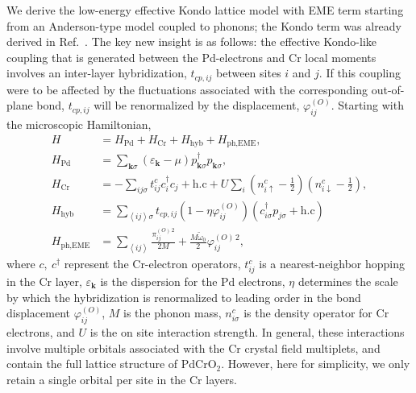 \documentclass[aps,prl,twocolumn,superscriptaddress,amsmath,nofootinbib,10pt,floatfix]{revtex4-2}
\begin{document}
\begin{widetext}
We derive the low-energy effective Kondo lattice model with EME term starting from an Anderson-type model coupled to phonons; the Kondo term was already derived in Ref.~\cite{sunko_probing_2020}.
The key new insight is as follows: the effective Kondo-like coupling
that is generated between the Pd-electrons and Cr local moments involves
an inter-layer hybridization, $t_{cp,ij}$ between sites $i$ and $j$.
If this coupling were to be affected by the fluctuations associated
with the corresponding out-of-plane bond, $t_{cp,ij}$ will be renormalized
by the displacement, $\varphi^{(O)}_{ij}$. Starting with the microscopic
Hamiltonian,
\begin{align}
H & =H_{\text{Pd}}+H_{\text{Cr}}+H_{\text{hyb}}+H_{\text{ph,EME}},\\
H_{\text{Pd}} & =\sum_{\boldsymbol{k}\sigma}\left(\varepsilon_{\boldsymbol{k}}-\mu\right)p_{\boldsymbol{k}\sigma}^{\dagger}p_{\boldsymbol{k}\sigma},\\
H_{\text{Cr}} & =-\sum_{ij\sigma}t_{ij}^{c}c_{i}^{\dagger}c_{j}+\text{h.c}+U\sum_{i}\left(n_{i\uparrow}^{c}-\frac{1}{2}\right)\left(n_{i\downarrow}^{c}-\frac{1}{2}\right),\\
H_{\text{hyb}} & =\sum_{\left\langle ij\right\rangle \sigma}t_{cp,ij}\left(1-\eta\varphi^{(O)}_{ij}\right)\left(c_{i\sigma}^{\dagger}p_{j\sigma}+\text{h.c}\right)\\
H_{\text{ph,EME}} & =\sum_{\left\langle ij\right\rangle }\frac{\pi_{ij}^{(O)\,2}}{2M}+\frac{M\tilde{\omega}_{0}}{2}\varphi_{ij}^{(O)\,2},
\end{align}
where $c,~c^\dagger$ represent the Cr-electron operators, $t_{ij}^{c}$ is a nearest-neighbor hopping in the Cr layer, $\varepsilon_{\boldsymbol{k}}$
is the dispersion for the Pd electrons, $\eta$ determines the scale by which
the hybridization is renormalized to leading order in the bond displacement
$\varphi^{(O)}_{ij}$, $M$ is the phonon mass, $n_{i\sigma}^{c}$ is the
density operator for Cr electrons, and $U$ is the on site interaction
strength. In general, these interactions  involve multiple orbitals associated with the Cr crystal field multiplets, and contain the full lattice structure of PdCrO$_{2}$. However, here for simplicity, we only retain a single orbital per site in the Cr layers.


\end{widetext}
\end{document}
